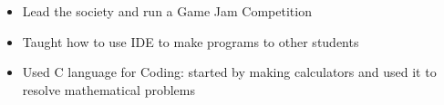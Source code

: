 \documentclass[10pt,a4paper,ragged2e]{altacv}
\begin{document}
\divider


\begin{itemize}

\item Lead the society and run a Game Jam Competition
\item Taught how to use IDE to make programs to other students
\item Used C language for Coding: started by making calculators and used it to resolve mathematical problems


\end{itemize}







\clearpage


\nocite{*}






\end{document}
